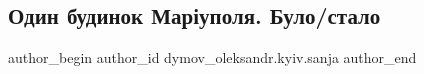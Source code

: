  
 
 
 
 

\subsection{Один будинок Маріуполя. Було/стало}
\label{sec:12_01_2023.fb.dymov_oleksandr.kyiv.sanja.1.odin_budinok_mar_upo}

\ifcmt
 author_begin
   author_id dymov_oleksandr.kyiv.sanja
 author_end
\fi
